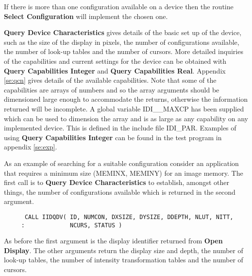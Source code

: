 If there is more than one configuration available on a device then the
routine {\bf Select Configuration} will implement the chosen one.

{\bf Query Device Characteristics} gives details of the basic set up
of the device, such as the size of the display in pixels, the number
of configurations available, the number of look-up tables and the number
of cursors. More detailed inquiries of the capabilities and current
settings for the device can be obtained with {\bf Query Capabilities
Integer} and {\bf Query Capabilities Real}.
Appendix \ref{se:qcn} gives details of the available capabilities. Note that
some of the capabilities are arrays of numbers and so the array arguments
should be dimensioned large enough to accommodate the returns, otherwise the
information returned will be incomplete. A global variable IDI\_\_MAXCP
has been supplied which can be used to dimension the array and is
as large as any capability on any implemented device. This is defined
in the include file IDI\_PAR. Examples of using
{\bf Query Capabilities Integer} can be found in the test program
in appendix \ref{se:exp}.

As an example of searching for a suitable configuration consider an
application that requires a minimum size (MEMINX, MEMINY) for an
image memory. The first call is to {\bf Query Device Characteristics}
to establish, amongst other things, the number of configurations
available which is returned in the second argument.
\begin{small}
\begin{verbatim}
      CALL IIDQDV( ID, NUMCON, DXSIZE, DYSIZE, DDEPTH, NLUT, NITT,
     :             NCURS, STATUS )
\end{verbatim}
\end{small}
As before the first argument is the display identifier returned from
{\bf Open Display}. The other arguments return the display size and
depth, the number of look-up tables, the number of intensity
transformation tables and the number of cursors.

